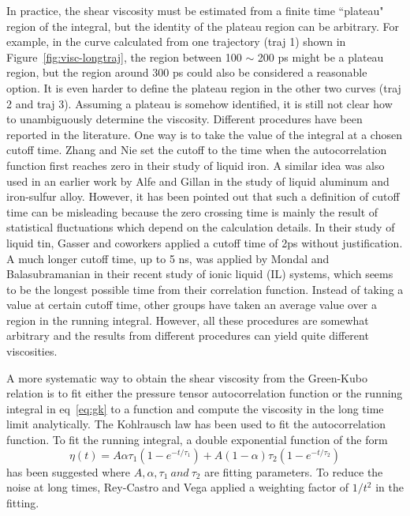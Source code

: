 \documentclass[12pt]{article}
\begin{document}
In practice, the shear viscosity must be estimated from a finite time ``plateau" region of the integral, but the identity of the plateau region can be arbitrary. For example, in the curve calculated from one trajectory (traj 1) shown in Figure~\ref{fig:visc-longtraj},
the region between 100 $\sim$  200 ps might be a plateau region,
but the region around 300 ps could also be considered a reasonable option.
It is even harder to define the plateau region in the other two curves (traj 2 and traj 3).
Assuming a plateau is somehow identified,
it is still  not clear how to unambiguously determine the viscosity.
Different procedures have been reported in the literature.
One way is to take the value of the integral at a chosen cutoff time.
Zhang and Nie \cite{Nie.PCM.27.164.2000} set the cutoff to the time when the autocorrelation function first reaches zero 
in their study of liquid iron. 
A similar idea was also used in an earlier work by Alfe and Gillan \cite{Alfe.PRL.81.5161.1998}
in the study of liquid aluminum and iron-sulfur alloy.
However, it has been pointed out that such a definition of cutoff time can be misleading 
because the zero crossing time is mainly the result of statistical fluctuations
which depend on the calculation details.
\cite{Gasser.JCP.136.094501.2012}
In their study of liquid tin,
Gasser and coworkers applied a cutoff time of 2ps without justification.
A much longer cutoff time, up to 5 ns, was applied by Mondal and Balasubramanian in their recent study of ionic liquid (IL) systems,
\cite{Bala.JCED.59.3061.2014}
which seems to be the longest possible time from their correlation function.
Instead of taking a value at certain cutoff time, 
other groups have taken an average value over a region in the running integral.
\cite{Smit.JCP.131.246101.2009,
Kazandjian.PRE.85.066701.2012}
However, all these procedures are somewhat arbitrary and
the results from different procedures can yield quite different viscosities.

A more systematic way to obtain the shear viscosity from the Green-Kubo relation
is to fit either the pressure tensor autocorrelation function 
or the running integral in eq~\ref{eq:gk} to a function
and compute the viscosity in the long time limit analytically.
The Kohlrausch law has been used to fit the autocorrelation function.
\cite{Zhang.MP.100.2617.2002,
Meyer.PRE.90.043101.2014}
To fit the running integral,
a double exponential function of the form 
\begin{equation}
{\eta(t) = A\alpha\tau_1(1-e^{-t/{\tau_1}}) + A(1-\alpha)\tau_2(1-e^{-t/{\tau_2}}) }
\label{eq:visc_fit}
\end{equation}
has been suggested 
where $A, \alpha, \tau_1 \ and \ \tau_2$ are fitting parameters.
\cite{Hess.JCP.116.209.2002,
Rey-Castro.JPC.B.110.14426.2006}
To reduce the noise at long times,
Rey-Castro and Vega applied a weighting factor of $1/t^2$ in the fitting.
\cite{Rey-Castro.JPC.B.110.14426.2006}
\end{document}
